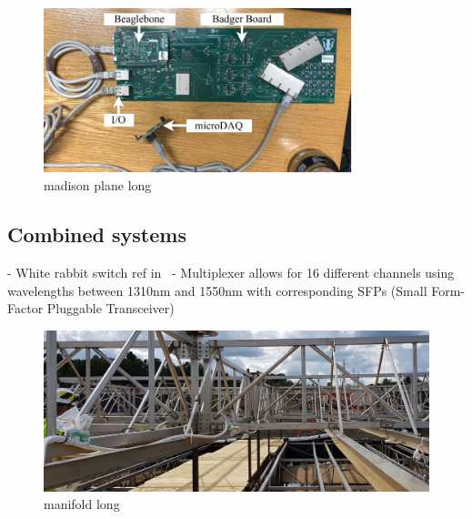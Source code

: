 \begin{figure} %
    \includegraphics[width=0.8\textwidth]{diagrams/5-daq/madison_plane.pdf}
    \caption[madison plane short]
    {madison plane long}

    \label{fig:madison_plane}
\end{figure}

\subsection{Combined systems} %
\label{sec:daq_hard_combined} %

- White rabbit switch ref in~\cite{wrswitch2020}
- Multiplexer allows for 16 different channels using wavelengths between 1310nm and 1550nm with
corresponding SFPs (Small Form-Factor Pluggable Transceiver)

\begin{figure} %
    \includegraphics[width=\textwidth]{diagrams/5-daq/manifold.jpg}
    \caption[manifold short]
    {manifold long}
    \label{fig:manifold}
\end{figure}



